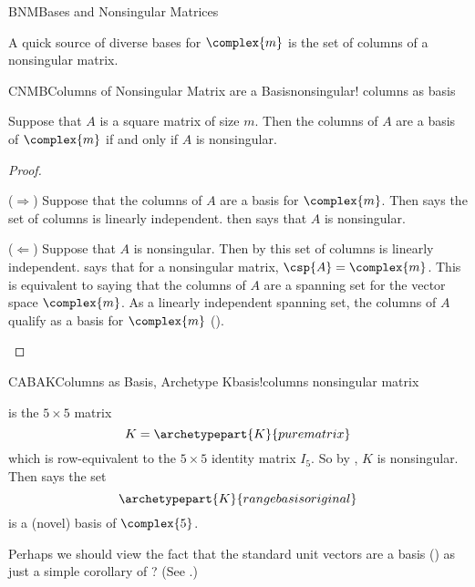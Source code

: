 \begin{subsect}{BNM}{Bases and Nonsingular Matrices}
%
\begin{para}A quick source of diverse bases for $\complex{m}$ is the set of columns of a nonsingular matrix.\end{para}
%
\begin{theorem}{CNMB}{Columns of Nonsingular Matrix are a Basis}{nonsingular! columns as basis}
\begin{para}Suppose that $A$ is a square matrix of size $m$.  Then the columns of $A$ are a basis of $\complex{m}$ if and only if $A$ is nonsingular.\end{para}
\end{theorem}
%
\begin{proof}
\begin{para}($\Rightarrow$)  Suppose that the columns of $A$ are a basis for $\complex{m}$.  Then  says the set of columns is linearly independent.   then says that $A$ is nonsingular.\end{para}
%
\begin{para}($\Leftarrow$)  Suppose that $A$ is nonsingular.  Then by  this set of columns is linearly independent.   says that for a nonsingular matrix, $\csp{A}=\complex{m}$.  This is equivalent to saying that the columns of $A$ are a spanning set for the vector space $\complex{m}$.  As a linearly independent spanning set, the columns of $A$ qualify as a basis for $\complex{m}$ ().\end{para}
\end{proof}
%
\begin{example}{CABAK}{Columns as Basis, Archetype K}{basis!columns nonsingular matrix}
\begin{para} is the $5\times 5$ matrix
%
\begin{equation*}
K=\archetypepart{K}{purematrix}\end{equation*}
%
which is row-equivalent to the $5\times 5$ identity matrix $I_5$.  So by , $K$ is nonsingular.  Then  says the set
%
\begin{equation*}
\archetypepart{K}{rangebasisoriginal}\end{equation*}
%
is a (novel) basis of $\complex{5}$.\end{para}
%
\end{example}
%
\begin{para}Perhaps we should view the fact that the standard unit vectors are a basis () as just a simple corollary of ?  (See .)\end{para}

\end{subsect}
